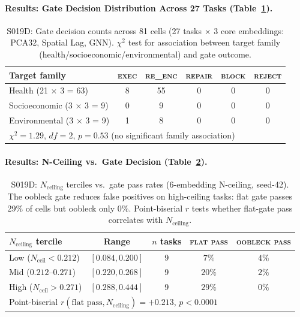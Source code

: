 \documentclass{article}
\begin{document}
\paragraph{Results: Gate Decision Distribution Across 27 Tasks (Table~\ref{tab:s019d_gates}).}

\begin{table}[htbp]
\centering
\small
\caption{S019D: Gate decision counts across 81 cells (27 tasks $\times$ 3 core embeddings: PCA32, Spatial Lag, GNN). $\chi^2$ test for association between target family (health/socioeconomic/environmental) and gate outcome.}
\label{tab:s019d_gates}
\begin{tabular}{l|ccccc}
\toprule
\textbf{Target family} & \textsc{exec} & \textsc{re\_enc} & \textsc{repair} & \textsc{block} & \textsc{reject} \\
\midrule
Health (21 $\times$ 3 = 63)       & 8  & 55 & 0 & 0 & 0 \\
Socioeconomic (3 $\times$ 3 = 9)  & 0  & 9  & 0 & 0 & 0 \\
Environmental (3 $\times$ 3 = 9)  & 1  & 8  & 0 & 0 & 0 \\
\midrule
\multicolumn{6}{l}{$\chi^2 = 1.29$, $df = 2$, $p = 0.53$ (no significant family association)} \\
\bottomrule
\end{tabular}
\end{table}

\paragraph{Results: N-Ceiling vs.\ Gate Decision (Table~\ref{tab:s019d_nceiling_gate}).}

\begin{table}[htbp]
\centering
\small
\caption{S019D: $N_{\text{ceiling}}$ terciles vs.\ gate pass rates (6-embedding N-ceiling, seed-42). The oobleck gate reduces false positives on high-ceiling tasks: flat gate passes 29\% of cells but oobleck only 0\%. Point-biserial $r$ tests whether flat-gate pass correlates with $N_{\text{ceiling}}$.}
\label{tab:s019d_nceiling_gate}
\begin{tabular}{l|cc|cc}
\toprule
$N_{\text{ceiling}}$ \textbf{tercile} & \textbf{Range} & $n$ \textbf{tasks} & \textsc{flat pass} & \textsc{oobleck pass} \\
\midrule
Low ($N_{\text{ceil}} < 0.212$)   & $[0.084, 0.200]$ & 9 & $7\%$ & $4\%$ \\
Mid ($0.212$--$0.271$)            & $[0.220, 0.268]$ & 9 & $20\%$ & $2\%$ \\
High ($N_{\text{ceil}} > 0.271$)  & $[0.288, 0.444]$ & 9 & $29\%$ & $0\%$ \\
\midrule
\multicolumn{5}{l}{Point-biserial $r(\text{flat pass}, N_{\text{ceiling}}) = +0.213$, $p < 0.0001$} \\
\bottomrule
\end{tabular}
\end{table}
\end{document}
